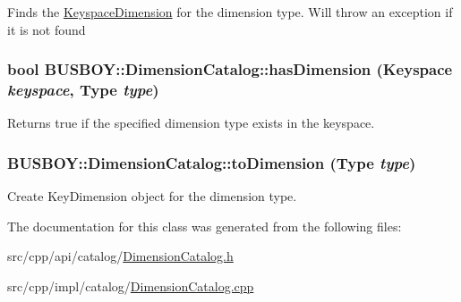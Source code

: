Finds the \hyperlink{classBUSBOY_1_1KeyspaceDimension}{KeyspaceDimension} for the dimension type. Will throw an exception if it is not found \hypertarget{classBUSBOY_1_1DimensionCatalog_a35e695e7edf0d1820f18c8121224d581}{
\subsubsection[{hasDimension}]{\setlength{\rightskip}{0pt plus 5cm}bool BUSBOY::DimensionCatalog::hasDimension ({\bf Keyspace} {\em keyspace}, \/  {\bf Type} {\em type})}}
\label{classBUSBOY_1_1DimensionCatalog_a35e695e7edf0d1820f18c8121224d581}


Returns true if the specified dimension type exists in the keyspace. \hypertarget{classBUSBOY_1_1DimensionCatalog_a9646e50de520c49e7e36a93d036d106c}{
\subsubsection[{toDimension}]{ BUSBOY::DimensionCatalog::toDimension ({\bf Type} {\em type})}}
\label{classBUSBOY_1_1DimensionCatalog_a9646e50de520c49e7e36a93d036d106c}


Create KeyDimension object for the dimension type. 

The documentation for this class was generated from the following files:\begin{DoxyCompactItemize}
\item 
src/cpp/api/catalog/\hyperlink{DimensionCatalog_8h}{DimensionCatalog.h}\item 
src/cpp/impl/catalog/\hyperlink{DimensionCatalog_8cpp}{DimensionCatalog.cpp}\end{DoxyCompactItemize}
